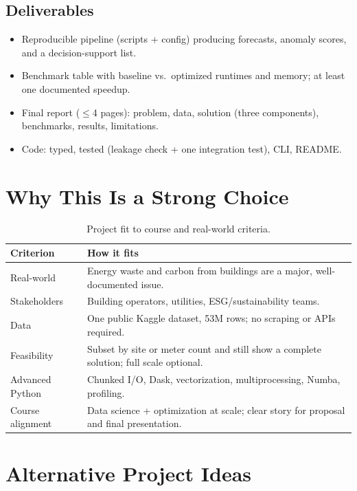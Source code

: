 \documentclass[11pt,a4paper]{article}
\begin{document}
\subsection{Deliverables}
\begin{itemize}[noitemsep]
    \item Reproducible pipeline (scripts + config) producing forecasts, anomaly scores, and a decision-support list.
    \item Benchmark table with baseline vs.\ optimized runtimes and memory; at least one documented speedup.
    \item Final report ($\leq$4 pages): problem, data, solution (three components), benchmarks, results, limitations.
    \item Code: typed, tested (leakage check + one integration test), CLI, README.
\end{itemize}

\section{Why This Is a Strong Choice}

\begin{table}[h]
\centering
\begin{tabular}{@{}ll@{}}
\toprule
\textbf{Criterion} & \textbf{How it fits} \\
\midrule
Real-world & Energy waste and carbon from buildings are a major, well-documented issue. \\
Stakeholders & Building operators, utilities, ESG/sustainability teams. \\
Data & One public Kaggle dataset, 53M rows; no scraping or APIs required. \\
Feasibility & Subset by site or meter count and still show a complete solution; full scale optional. \\
Advanced Python & Chunked I/O, Dask, vectorization, multiprocessing, Numba, profiling. \\
Course alignment & Data science + optimization at scale; clear story for proposal and final presentation. \\
\bottomrule
\end{tabular}
\caption{Project fit to course and real-world criteria.}
\end{table}

\section{Alternative Project Ideas}
\end{document}
